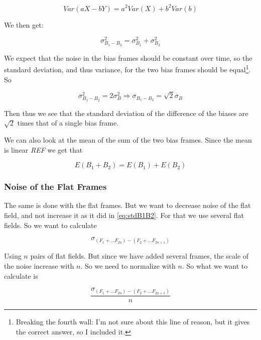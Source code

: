 \documentclass{emulateapj}
\begin{document}
\begin{equation}
Var(aX - bY) = a^2Var(X) + b^2Var(b)
\end{equation}

We then get:

\begin{equation}
\sigma_{B_1 - B_2}^2 = \sigma_{B_1}^2 + \sigma_{B_2}^2
\end{equation}

We expect that the noise in the bias frames should be constant over time, so the standard deviation, and thus variance, for the two bias frames should be equal\footnote{Breaking the fourth wall: I'm not sure about this line of reason, but it gives the correct answer, so I included it.}. So

\begin{equation}
\sigma_{B_1 - B_2}^2 = 2\sigma_{B}^2 \Rightarrow \sigma_{B_1 - B_2} = \sqrt{2}\sigma_B
\label{eq:stdB1B2}
\end{equation}

Then thus we see that the standard deviation of the difference of the biases are $\sqrt{2}$ times that of a single bias frame.

We can also look at the mean of the sum of the two bias frames. Since the mean is linear \emph{REF} we get that

\begin{equation}
E(B_1 + B_2) = E(B_1) + E(B_2)
\label{eq:meanB}
\end{equation}

\subsubsection{Noise of the Flat Frames}
\label{sec:noiseFlat}
The same is done with the flat frames. But we want to decrease noise of the flat field, and not increase it as it did in \eqref{eq:stdB1B2}. For that we use several flat fields. So we want to calculate

\begin{equation}
\sigma_{(F_1 + \ldots F_{2n})- (F_2 + \ldots F_{2n+1})}
\end{equation}

Using $n$ pairs of flat fields. But since we have added several frames, the scale of the noise increase with $n$. So we need to normalize with $n$. So what we want to calculate is

\begin{equation}
\frac{\sigma_{(F_1 + \ldots F_{2n})- (F_2 + \ldots F_{2n+1})}}{n}
\end{equation}
\end{document}

